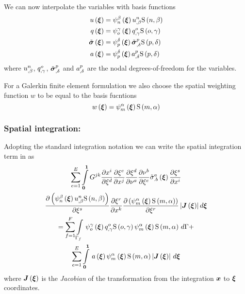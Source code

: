 We can now interpolate the variables with basis functions \ie
\begin{equation}
  \begin{split}
     u\left( \boldsymbol{\xi} \right)  &=
       \psi_{n}^{\beta} \left( \boldsymbol{\xi} \right)    {u}^{n} _{,\beta}    \mathrm{S} \left( n,\beta \right)   \\
     q\left( \boldsymbol{\xi} \right)  &= 
       \psi_{o}^{\gamma} \left( \boldsymbol{\xi} \right)    {q}^{o} _{,\gamma}    \mathrm{S} \left( o,\gamma \right)   \\
     \tilde{\boldsymbol{\mathit{\sigma}}}\left( \boldsymbol{\xi} \right)  &=
       \psi_{p}^{\delta} \left( \boldsymbol{\xi} \right)    {\tilde{\boldsymbol{\mathit{\sigma}}}}^{p} _{,\delta}    \mathrm{S} \left( p,\delta \right)   \\
     a\left( \boldsymbol{\xi} \right)  &=
       \psi_{p}^{\delta} \left( \boldsymbol{\xi} \right)    {a}^{p} _{,\delta}    \mathrm{S} \left( p,\delta \right)  
  \end{split}
\end{equation}
where $  {u}^{n} _{,\beta} $, $  {q}^{o} _{,\gamma} $, 
$  {\tilde{\boldsymbol{\mathit{\sigma}}}}^{p} _{,\delta} $ and $  {a}^{p} _{,\delta} $ are the
nodal degrees-of-freedom for the variables.

For a Galerkin finite element formulation we also choose the spatial weighting
function $w$ to be equal to the basis fucntions \ie
\begin{equation}
   w\left( \boldsymbol{\xi} \right) =   \psi_{m}^{\alpha} \left( \boldsymbol{\xi} \right)     \mathrm{S} \left( m,\alpha \right)  
\end{equation}

\subsubsection{Spatial integration:}

Adopting the standard integration notation we can write the spatial
integration term in  as
\begin{multline}
  \dsum_{e=1}^{E}\dintl{\vectr{0}}{\vectr{1}}G^{jk}\delby{x^{i}}{\xi^{d}}
    \delby{\xi^{e}}{x^{j}}\delby{\xi^{d}}{\nu^{a}}
    \delby{\nu^{b}}{\xi^{e}}\fnof{{\tilde{\sigma}}^{a}_{.b}}{\vectr{\xi}}\delby{\xi^{s}}{x^{i}} \\
    \delby{\pbrac{\gbfn{n}{\beta}{\vectr{\xi}}\nodedof{u}{n}{\beta}\gsf{n}{\beta}}}{\xi^{s}}
    \delby{\xi^{r}}{x^{k}}\delby{\pbrac{\gbfn{m}{\alpha}{\vectr{\xi}}\gsf{m}{\alpha}}}{\xi^{r}}
    \abs{\fnof{\matr{J}}{\vectr{\xi}}}d\vectr{\xi} \\ 
  = \dsum_{f=1}^{F}\gint{\Gamma_{f}}{}{\gbfn{o}{\gamma}{\vectr{\xi}}\nodedof{q}{o}{\gamma}
    \gsf{o}{\gamma}\gbfn{m}{\alpha}{\vectr{\xi}}\gsf{m}{\alpha}}{\Gamma} + \\
  \dsum_{e=1}^{E}\gint{\vectr{0}}{\vectr{1}}{\fnof{a}{\vectr{\xi}}\gbfn{m}{\alpha}{\vectr{\xi}}
    \gsf{m}{\alpha}\abs{\fnof{\matr{J}}{\vectr{\xi}}}}{\vectr{\xi}}
\end{multline}
where $\fnof{\matr{J}}{\vectr{\xi}}$ is the \emph{Jacobian} of the
transformation from the integration $\boldsymbol{x}$ to $\boldsymbol{\xi}$ coordinates.

